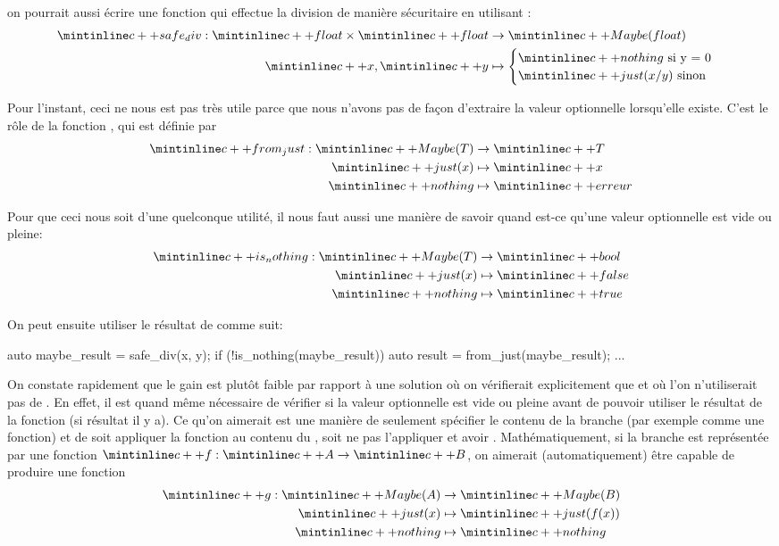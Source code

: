 on pourrait aussi écrire une fonction qui effectue la division de manière
sécuritaire en utilisant :
\begin{align*}
    \cc{safe_div} : \cc{float} \times \cc{float} &\to \cc{Maybe(float)} \\
                    \cc{x}, \cc{y} &\mapsto \begin{cases}
                                        \cc{nothing} \text{ si y = 0} \\
                                        \cc{just(x / y)} \text{ sinon}
                                    \end{cases}
\end{align*}

Pour l'instant, ceci ne nous est pas très utile parce que nous n'avons pas
de façon d'extraire la valeur optionnelle lorsqu'elle existe. C'est le rôle
de la fonction , qui est définie par
\begin{align*}
    \cc{from_just} : \cc{Maybe(T)} &\to \cc{T} \\
                        \cc{just(x)} &\mapsto \cc{x} \\
                        \cc{nothing} &\mapsto \cc{erreur}
\end{align*}

Pour que ceci nous soit d'une quelconque utilité, il nous faut aussi une
manière de savoir quand est-ce qu'une valeur optionnelle est vide ou pleine:
\begin{align*}
    \cc{is_nothing} : \cc{Maybe(T)} &\to \cc{bool} \\
                      \cc{just(x)} &\mapsto \cc{false} \\
                      \cc{nothing} &\mapsto \cc{true}
\end{align*}

On peut ensuite utiliser le résultat de  comme suit:
\begin{cpp}
    auto maybe_result = safe_div(x, y);
    if (!is_nothing(maybe_result)) {
        auto result = from_just(maybe_result);
        ...
    }
\end{cpp}

On constate rapidement que le gain est plutôt faible par rapport à une
solution où on vérifierait explicitement que  et où l'on
n'utiliserait pas de . En effet, il est quand même nécessaire
de vérifier si la valeur optionnelle est vide ou pleine avant de pouvoir
utiliser le résultat de la fonction (si résultat il y a). Ce qu'on aimerait
est une manière de seulement spécifier le contenu de la branche (par exemple
comme une fonction) et de soit appliquer la fonction au contenu du ,
soit ne pas l'appliquer et avoir . Mathématiquement, si la
branche est représentée par une fonction $\cc{f} : \cc{A} \to \cc{B}$, on
aimerait (automatiquement) être capable de produire une fonction
\begin{align*}
    \cc{g} : \cc{Maybe(A)} &\to \cc{Maybe(B)}       \\
             \cc{just(x)} &\mapsto \cc{just(f(x))}  \\
             \cc{nothing} &\mapsto \cc{nothing}
\end{align*}

